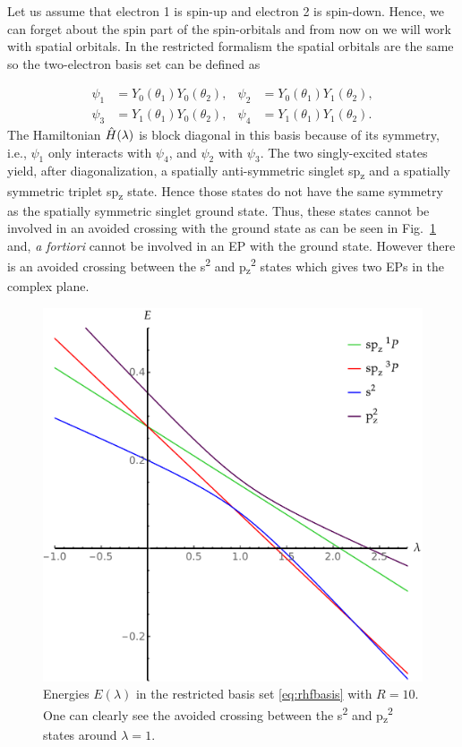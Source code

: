 \documentclass[11pt,a4paper]{article}
\newcommand{\hH}{\Hat{H}}
\begin{document}
Let us assume that electron 1 is spin-up and electron 2 is spin-down. 
Hence, we can forget about the spin part of the spin-orbitals and from now on we will work with spatial orbitals. In the restricted formalism the spatial orbitals are the same so the two-electron basis set can be defined as

\begin{align}\label{eq:rhfbasis}
 \psi_1 & =Y_{0}(\theta_1)Y_{0}(\theta_2),
 & 
 \psi_2 & =Y_{0}(\theta_1)Y_{1}(\theta_2),\\
 \psi_3 & =Y_{1}(\theta_1)Y_{0}(\theta_2),
 & 
 \psi_4 & =Y_{1}(\theta_1)Y_{1}(\theta_2).
\end{align}
The Hamiltonian $\hH(\lambda)$ is block diagonal in this basis because of its symmetry, i.e., $\psi_1$ only interacts with $\psi_4$, and $\psi_2$ with $\psi_3$. The two singly-excited states yield, after diagonalization, a spatially anti-symmetric singlet sp\textsubscript{z} and a spatially symmetric triplet sp\textsubscript{z} state. Hence those states do not have the same symmetry as the spatially symmetric singlet ground state. Thus, these states cannot be involved in an avoided crossing with the ground state as can be seen in Fig.~\ref{fig:RHFMiniBas} and, \textit{a fortiori} cannot be involved in an EP with the ground state. However there is an avoided crossing between the s\textsuperscript{2} and p\textsubscript{z}\textsuperscript{2} states which gives two EPs in the complex plane. 

\begin{figure}
    \centering
    \includegraphics[width=\linewidth]{EMP_RHF_R10.pdf}
    \caption{Energies $E(\lambda)$ in the restricted basis set \eqref{eq:rhfbasis} with $R=10$.
    One can clearly see the avoided crossing between the s\textsuperscript{2} and p\textsubscript{z}\textsuperscript{2} states around $\lambda = 1$.}
    \label{fig:RHFMiniBas}
\end{figure}
\end{document}
